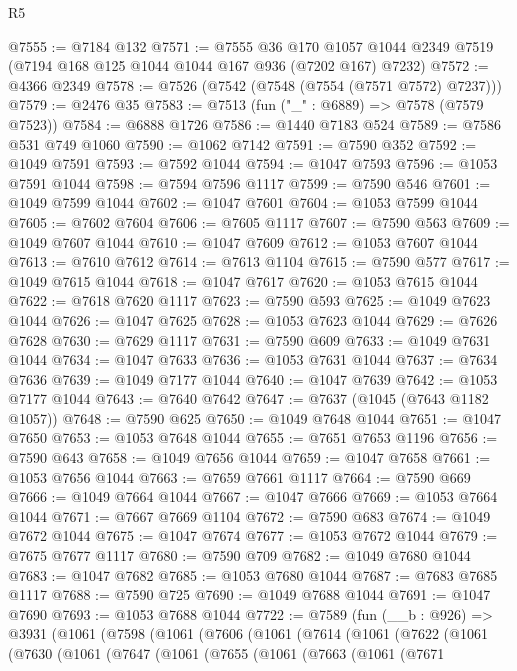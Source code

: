 \begin{lexlean}{R5}
\begin{coremodule}
@7555 := @7184 @132
@7571 := @7555
    @36
    @170
    @1057
    @1044
    @2349
    @7519
    (@7194 @168 @125 @1044 @1044 @167 @936 (@7202 @167) @7232)
@7572 := @4366 @2349
@7578 := @7526 (@7542 (@7548 (@7554 (@7571 @7572) @7237)))
@7579 := @2476 @35
@7583 := @7513 (fun ("_" : @6889) => @7578 (@7579 @7523))
@7584 := @6888 @1726
@7586 := @1440 @7183 @524
@7589 := @7586 @531 @749 @1060
@7590 := @1062 @7142
@7591 := @7590 @352
@7592 := @1049 @7591
@7593 := @7592 @1044
@7594 := @1047 @7593
@7596 := @1053 @7591 @1044
@7598 := @7594 @7596 @1117
@7599 := @7590 @546
@7601 := @1049 @7599 @1044
@7602 := @1047 @7601
@7604 := @1053 @7599 @1044
@7605 := @7602 @7604
@7606 := @7605 @1117
@7607 := @7590 @563
@7609 := @1049 @7607 @1044
@7610 := @1047 @7609
@7612 := @1053 @7607 @1044
@7613 := @7610 @7612
@7614 := @7613 @1104
@7615 := @7590 @577
@7617 := @1049 @7615 @1044
@7618 := @1047 @7617
@7620 := @1053 @7615 @1044
@7622 := @7618 @7620 @1117
@7623 := @7590 @593
@7625 := @1049 @7623 @1044
@7626 := @1047 @7625
@7628 := @1053 @7623 @1044
@7629 := @7626 @7628
@7630 := @7629 @1117
@7631 := @7590 @609
@7633 := @1049 @7631 @1044
@7634 := @1047 @7633
@7636 := @1053 @7631 @1044
@7637 := @7634 @7636
@7639 := @1049 @7177 @1044
@7640 := @1047 @7639
@7642 := @1053 @7177 @1044
@7643 := @7640 @7642
@7647 := @7637 (@1045 (@7643 @1182 @1057))
@7648 := @7590 @625
@7650 := @1049 @7648 @1044
@7651 := @1047 @7650
@7653 := @1053 @7648 @1044
@7655 := @7651 @7653 @1196
@7656 := @7590 @643
@7658 := @1049 @7656 @1044
@7659 := @1047 @7658
@7661 := @1053 @7656 @1044
@7663 := @7659 @7661 @1117
@7664 := @7590 @669
@7666 := @1049 @7664 @1044
@7667 := @1047 @7666
@7669 := @1053 @7664 @1044
@7671 := @7667 @7669 @1104
@7672 := @7590 @683
@7674 := @1049 @7672 @1044
@7675 := @1047 @7674
@7677 := @1053 @7672 @1044
@7679 := @7675 @7677 @1117
@7680 := @7590 @709
@7682 := @1049 @7680 @1044
@7683 := @1047 @7682
@7685 := @1053 @7680 @1044
@7687 := @7683 @7685 @1117
@7688 := @7590 @725
@7690 := @1049 @7688 @1044
@7691 := @1047 @7690
@7693 := @1053 @7688 @1044
@7722 := @7589
    (fun (__b : @926) =>
    @3931
      (@1061
        (@7598
          (@1061
            (@7606
              (@1061
                (@7614
                  (@1061
                    (@7622
                      (@1061
                        (@7630
                          (@1061
                            (@7647
                              (@1061
                                (@7655
                                  (@1061
                                    (@7663
                                      (@1061
                                        (@7671

\end{coremodule}
\end{lexlean}
